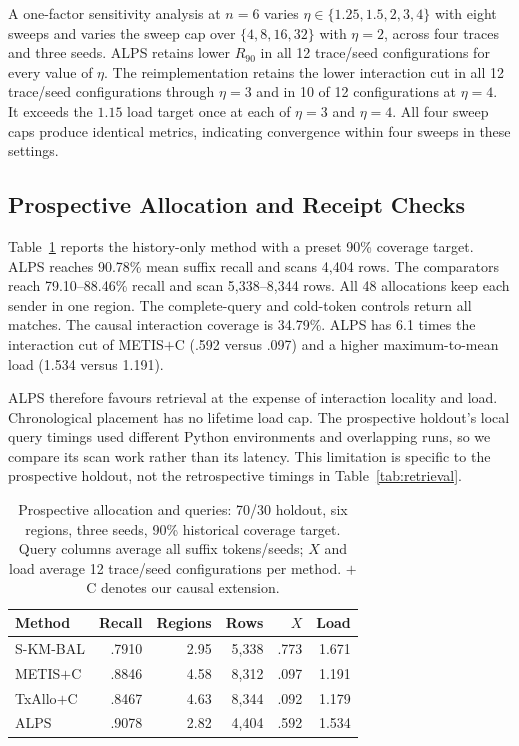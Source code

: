\documentclass[conference,letterpaper]{IEEEtran}
\begin{document}
A one-factor sensitivity analysis at $n=6$ varies
$\eta\in\{1.25,1.5,2,3,4\}$ with eight sweeps and varies the sweep cap over
$\{4,8,16,32\}$ with $\eta=2$, across four traces and three seeds. ALPS retains
lower $R_{90}$ in all 12 trace/seed configurations for every value of $\eta$.
The reimplementation retains the lower interaction cut in all 12 trace/seed configurations
through $\eta=3$ and in 10 of 12 configurations at $\eta=4$. It exceeds the
$1.15$ load target once at each of $\eta=3$ and $\eta=4$. All four sweep caps
produce identical metrics, indicating convergence within four sweeps in these
settings.

\subsection{Prospective Allocation and Receipt Checks}
\label{sec:prospective_results}
Table~\ref{tab:prospective} reports the history-only method with a preset
90\% coverage target. ALPS reaches 90.78\% mean suffix recall and scans 4,404
rows. The comparators reach 79.10--88.46\% recall and scan 5,338--8,344 rows.
All 48 allocations keep each sender in one region. The complete-query and
cold-token controls return all matches. The causal interaction coverage is
34.79\%. ALPS has 6.1 times the interaction cut of METIS$+$C (.592 versus
.097) and a higher maximum-to-mean load (1.534 versus 1.191).

ALPS therefore favours retrieval at the expense of interaction locality and
load. Chronological placement has no lifetime load cap. The prospective
holdout's local query timings used different Python environments and overlapping
runs, so we compare its scan work rather than its latency. This limitation is
specific to the prospective holdout, not the retrospective timings in
Table~\ref{tab:retrieval}.

\begin{table}[t]
\caption{Prospective allocation and queries: 70/30 holdout, six regions, three
seeds, 90\% historical coverage target. Query columns average all suffix
tokens/seeds; $X$ and load average 12 trace/seed configurations per method.
$+$C denotes our causal extension.}
\label{tab:prospective}
\centering
\scriptsize
\setlength{\tabcolsep}{3pt}
\begin{tabular}{@{}lrrrrr@{}}
\toprule
Method & Recall & Regions & Rows & $X$ & Load\\
\midrule
S-KM-BAL & .7910 & 2.95 & 5,338 & .773 & 1.671\\
METIS$+$C & .8846 & 4.58 & 8,312 & .097 & 1.191\\
TxAllo$+$C & .8467 & 4.63 & 8,344 & .092 & 1.179\\
ALPS & .9078 & 2.82 & 4,404 & .592 & 1.534\\
\bottomrule
\end{tabular}
\end{table}
\end{document}
